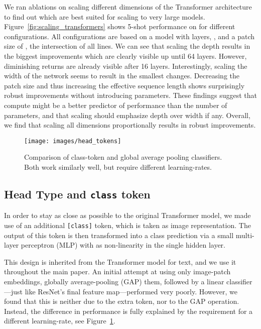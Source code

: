 We ran ablations on scaling different dimensions of the Transformer architecture to find out which are best suited for scaling to very large models. Figure~\ref{fig:scaling_transformers} shows 5-shot performance on \imagenet for different configurations. All configurations are based on a \oursabbrv model with  layers, ,  and a patch size of , the intersection of all lines. We can see that scaling the depth results in the biggest improvements which are clearly visible up until 64 layers. However, diminishing returns are already visible after 16 layers. Interestingly, scaling the width of the network seems to result in the smallest changes. Decreasing the patch size and thus increasing the effective sequence length shows surprisingly robust improvements without introducing parameters. These findings suggest that compute might be a better predictor of performance than the number of parameters, and that scaling should emphasize depth over width if any. Overall, we find that scaling all dimensions proportionally results in robust improvements.

\begin{figure}[t]
\begin{center}
\texttt{[image: images/head\_tokens]}
\end{center}
\caption{Comparison of class-token and global average pooling classifiers. Both work similarly well, but require different learning-rates.}
\label{fig:head_tokens}
\end{figure}

\subsection{Head Type and \texttt{class} token}
\label{app:head_types}
In order to stay as close as possible to the original Transformer model, we made use of an additional \texttt{[class]} token, which is taken as image representation. The output of this token is then transformed into a class prediction via a small multi-layer perceptron (MLP) with  as non-linearity in the single hidden layer.

This design is inherited from the Transformer model for text, and we use it throughout the main paper.
An initial attempt at using only image-patch embeddings, globally average-pooling (GAP) them, followed by a linear classifier---just like ResNet's final feature map---performed very poorly.
However, we found that this is neither due to the extra token, nor to the GAP operation. Instead, the difference in performance is fully explained by the requirement for a different learning-rate, see Figure~\ref{fig:head_tokens}.

